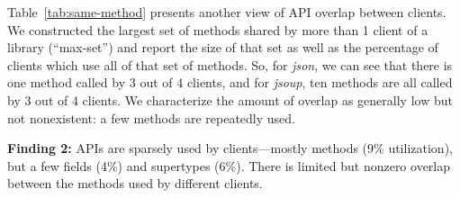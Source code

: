 Table~\ref{tab:same-method} presents another view of API overlap between clients. We constructed the largest set
of methods shared by more than 1 client of a library (``max-set'') and report the size of that set as well as the percentage
of clients which use all of that set of methods. So, for \emph{json}, we can see that there is one method called
by 3 out of 4 clients, and for \emph{jsoup}, ten methods are all called
by 3 out of 4 clients. We characterize the amount of overlap as generally low but not
nonexistent: a few methods are repeatedly used.

%


\begin{mdframed}[
  leftmargin=\parindent,
  rightmargin=\parindent,
  skipabove=\topsep,
  skipbelow=\topsep
  ]
{\bf Finding 2:} APIs are sparsely used by clients---mostly methods (9\% utilization), but a few fields (4\%) and supertypes (6\%). There is limited but nonzero overlap between the methods used by different clients.
\end{mdframed}
